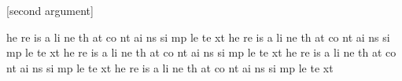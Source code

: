 [second argument]

\begin{myenv}
he
re
is
a
li
ne
th
at
co
nt
ai
ns
si
mp
le
te
xt
he
re
is
a
li
ne
th
at
co
nt
ai
ns
si
mp
le
te
xt
he
re
is
a
li
ne
th
at
co
nt
ai
ns
si
mp
le
te
xt
he
re
is
a
li
ne
th
at
co
nt
ai
ns
si
mp
le
te
xt
he
re
is
a
li
ne
th
at
co
nt
ai
ns
si
mp
le
te
xt
\end{myenv}
